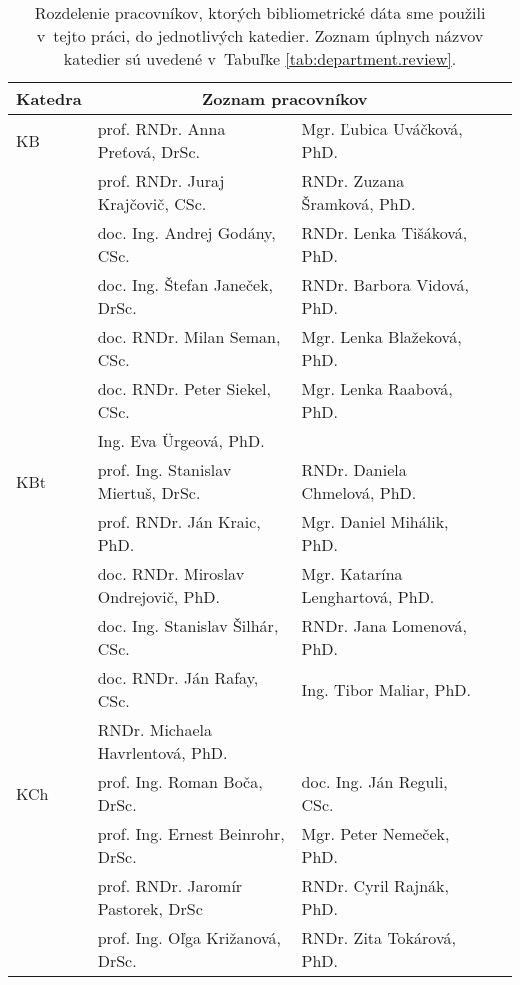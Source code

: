 \begin{table}
  \caption[Rozdelenie pracovníkov do jednotlivých katedier]{Rozdelenie
  pracovníkov, ktorých bibliometrické dáta sme použili v~tejto práci, do
  jednotlivých katedier. Zoznam úplnych názvov katedier sú uvedené v~Tabuľke
  \ref{tab:department.review}.} 
  \label{tab:staff.list}
\centering\small
\begin{tabular}{lllll}
  \toprule\noalign{\vspace{.3ex}}
   Katedra& \multicolumn{2}{c}{Zoznam pracovníkov}                  \\[0.3ex]
  \midrule\noalign{\vspace{.5ex}}
  KB   & prof. RNDr. Anna Preťová, DrSc. &  Mgr. Ľubica Uváčková, PhD.      \\ 
       & prof. RNDr. Juraj Krajčovič, CSc.& RNDr. Zuzana Šramková, PhD.       \\
       & doc. Ing. Andrej Godány, CSc. &    RNDr. Lenka Tišáková, PhD.     \\
       & doc. Ing. Štefan Janeček, DrSc.&   RNDr. Barbora Vidová, PhD.      \\
       & doc. RNDr. Milan Seman, CSc. &     Mgr. Lenka Blažeková, PhD.    \\
       & doc. RNDr. Peter Siekel, CSc. &    Mgr. Lenka Raabová, PhD.     \\
       & Ing. Eva Ürgeová, PhD. &    \\ [2ex]
  KBt  & prof. Ing. Stanislav Miertuš, DrSc.  & RNDr. Daniela Chmelová, PhD.            \\
       & prof. RNDr. Ján Kraic, PhD.          & Mgr. Daniel Mihálik, PhD.            \\
       & doc. RNDr. Miroslav Ondrejovič, PhD. & Mgr. Katarína Lenghartová, PhD.            \\
       & doc. Ing. Stanislav Šilhár, CSc.     & RNDr. Jana Lomenová, PhD.            \\
       & doc. RNDr. Ján Rafay, CSc.           & Ing. Tibor Maliar, PhD.            \\
       & RNDr. Michaela Havrlentová, PhD.     &            \\[2ex]
  KCh  & prof. Ing. Roman Boča, DrSc. & doc. Ing. Ján Reguli, CSc. \\
       & prof. Ing. Ernest Beinrohr, DrSc. & Mgr. Peter Nemeček, PhD. \\
       & prof. RNDr. Jaromír Pastorek, DrSc & RNDr. Cyril Rajnák, PhD. \\
       & prof. Ing. Oľga Križanová, DrSc. & RNDr. Zita Tokárová, PhD. \\ 

\end{tabular}
\end{table}

